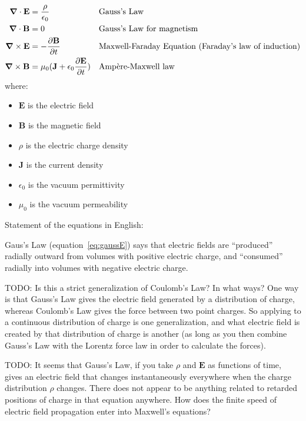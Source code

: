\documentclass[a4paper]{article}
\theoremstyle{plain}
\theoremstyle{definition}
\newcommand{\vect}[1]{\textbf{#1}}
\begin{document}
\begin{align}
  \grad \cdot \vect{E} & = \frac{\rho}{\epsilon_0} & & \text{Gauss's Law} \label{eq:gaussE} \\
  \grad \cdot \vect{B} & = 0 & & \text{Gauss's Law for magnetism} \label{eq:gaussB} \\
  \grad \times \vect{E} & = - \frac{\partial \vect{B}}{\partial t} & & \text{Maxwell-Faraday Equation (Faraday's law of induction)} \label{eq:maxfar} \\
  \grad \times \vect{B} & = \mu_0 ( \vect{J} + \epsilon_0 \frac{\partial \vect{E}}{\partial t} ) & & \text{Amp\`{e}re-Maxwell law} \label{eq:ampmax}
\end{align}
where:
\begin{itemize}
  \item $\vect{E}$ is the electric field
  \item $\vect{B}$ is the magnetic field
  \item $\rho$ is the electric charge density
  \item $\vect{J}$ is the current density
  \item $\epsilon_0$ is the vacuum permittivity
  \item $\mu_0$ is the vacuum permeability
\end{itemize}

Statement of the equations in English:

Gaus's Law (equation~\eqref{eq:gaussE}) says that electric fields are
``produced'' radially outward from volumes with positive electric
charge, and ``consumed'' radially into volumes with negative electric
charge.

TODO: Is this a strict generalization of Coulomb's Law?  In what ways?
One way is that Gauss's Law gives the electric field generated by a
distribution of charge, whereas Coulomb's Law gives the force between
two point charges.  So applying to a continuous distribution of charge
is one generalization, and what electric field is created by that
distribution of charge is another (as long as you then combine Gauss's
Law with the Lorentz force law in order to calculate the forces).

TODO: It seems that Gauss's Law, if you take $\rho$ and $\vect{E}$ as
functions of time, gives an electric field that changes
instantaneously everywhere when the charge distribution $\rho$
changes.  There does not appear to be anything related to retarded
positions of charge in that equation anywhere.  How does the finite
speed of electric field propagation enter into Maxwell's equations?
\end{document}
